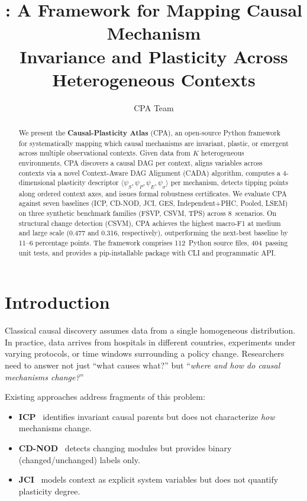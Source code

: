 \documentclass[11pt]{article}
\title{\cpa{}: A Framework for Mapping Causal Mechanism\\
Invariance and Plasticity Across Heterogeneous Contexts}
\author{CPA Team}
\date{}
\newcommand{\cpa}{\textsc{CPA}}
\newcommand{\cada}{\textsc{CADA}}
\begin{document}
\maketitle

\begin{abstract}
We present the \textbf{Causal-Plasticity Atlas} (\cpa{}), an open-source
Python framework for systematically mapping which causal mechanisms are
invariant, plastic, or emergent across multiple observational contexts.
Given data from $K$ heterogeneous environments, \cpa{} discovers a
causal DAG per context, aligns variables across contexts via a novel
Context-Aware DAG Alignment (\cada{}) algorithm, computes a 4-dimensional
plasticity descriptor $\langle \psi_S, \psi_P, \psi_E, \psi_\sigma \rangle$
per mechanism, detects tipping points along ordered context axes, and
issues formal robustness certificates. We evaluate \cpa{} against seven
baselines (ICP, CD-NOD, JCI, GES, Independent+PHC, Pooled, LSEM) on
three synthetic benchmark families (FSVP, CSVM, TPS) across 8~scenarios.
On structural change detection (CSVM), \cpa{} achieves the highest
macro-F1 at medium and large scale (0.477 and 0.316, respectively),
outperforming the next-best baseline by 11--6 percentage points. The
framework comprises 112~Python source files, 404~passing unit tests,
and provides a pip-installable package with CLI and programmatic API.
\end{abstract}

\section{Introduction}

Classical causal discovery assumes data from a single homogeneous
distribution. In practice, data arrives from hospitals in different
countries, experiments under varying protocols, or time windows
surrounding a policy change. Researchers need to answer not just
``what causes what?'' but ``\emph{where and how do causal mechanisms
change?}''

Existing approaches address fragments of this problem:
\begin{itemize}[nosep]
  \item \textbf{ICP}~\cite{peters2016} identifies invariant causal parents
    but does not characterize \emph{how} mechanisms change.
  \item \textbf{CD-NOD}~\cite{zhang2017} detects changing modules but
    provides binary (changed/unchanged) labels only.
  \item \textbf{JCI}~\cite{mooij2020} models context as explicit system
    variables but does not quantify plasticity degree.
\end{itemize}
\end{document}
